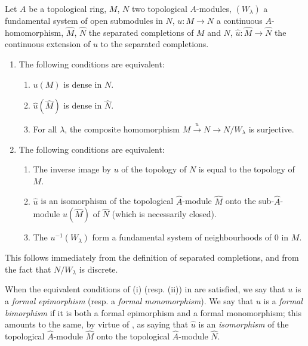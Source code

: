 \begin{proposition}[19.1.1]
\label{0.19.1.1}
Let $A$ be a topological ring, $M$, $N$ two topological $A$-modules, $(W_\lambda)$ a fundamental system of open submodules in $N$, $u:M\to N$ a continuous $A$-homomorphism, $\widehat{M}$, $\widehat{N}$ the separated completions of $M$ and $N$, $\hat{u}:\widehat{M}\to\widehat{N}$ the continuous extension of $u$ to the separated completions.
\begin{enumerate}
  \item[(i)] The following conditions are equivalent:
  \begin{enumerate}
    \item[a)] $u(M)$ is dense in $N$.
    \item[a$'$)] $\hat{u}(\widehat{M})$ is dense in $\widehat{N}$.
    \item[a$''$)] For all $\lambda$, the composite homomorphism $M\xrightarrow{u}N\to N/W_\lambda$ is surjective.
  \end{enumerate}
  \item[(ii)] The following conditions are equivalent:
  \begin{enumerate}
    \item[b)] The inverse image by $u$ of the topology of $N$ is equal to the topology of $M$.
    \item[b$'$)] $\hat{u}$ is an isomorphism of the topological $\widehat{A}$-module $\widehat{M}$ onto the sub-$\widehat{A}$-module $\hat{u}(\widehat{M})$ of $\widehat{N}$ (which is necessarily closed).
    \item[b$''$)] The $u^{-1}(W_\lambda)$ form a fundamental system of neighbourhoods of $0$ in $M$.
  \end{enumerate}
\end{enumerate}
This follows immediately from the definition of separated completions, and from the fact that $N/W_\lambda$ is discrete.
\end{proposition}

\begin{env}[19.1.2]
\label{0.19.1.2}
When the equivalent conditions of (i) (resp. (ii)) in  are satisfied, we say that $u$ is a \emph{formal epimorphism} (resp. a \emph{formal monomorphism}).
We say that $u$ is a \emph{formal bimorphism} if it is both a formal epimorphism and a formal monomorphism;
this amounts to the same, by virtue of , as saying that $\hat{u}$ is an \emph{isomorphism} of the topological $\widehat{A}$-module $\widehat{M}$ onto the topological $\widehat{A}$-module $\widehat{N}$.
\end{env}

